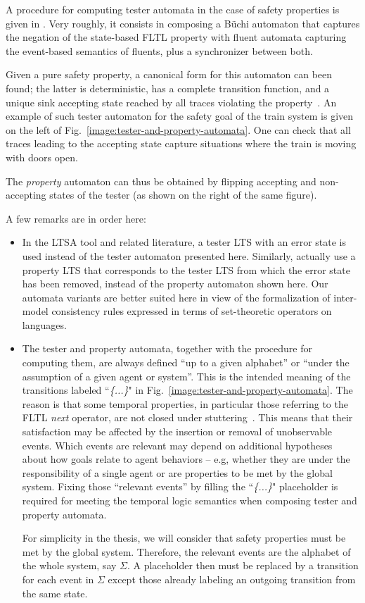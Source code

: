 A procedure for computing tester automata in the case of safety properties is given in \cite{Giannakopoulou:2003}. Very roughly, it consists in composing a B\"uchi automaton that captures the negation of the state-based FLTL property with fluent automata capturing the event-based semantics of fluents, plus a synchronizer between both. 

Given a pure safety property, a canonical form for this automaton can been found; the latter is deterministic, has a complete transition function, and a unique sink accepting state reached by all traces violating the property~\cite{Giannakopoulou:2003}. An example of such tester automaton for the safety goal of the train system is given on the left of Fig.~\ref{image:tester-and-property-automata}. One can check that all traces leading to the accepting state capture situations where the train is moving with doors open. 

The \emph{property} automaton can thus be obtained by flipping accepting and non-accepting states of the tester (as shown on the right of the same figure). 

A few remarks are in order here:
\begin{itemize}
\item In the LTSA tool \cite{Magee:1999} and related literature, a tester LTS with an error state is used instead of the tester automaton presented here. Similarly, \cite{Letier:2005, Letier:2008} actually use a property LTS that corresponds to the tester LTS from which the error state has been removed, instead of the property automaton shown here. Our automata variants are better suited here in view of the formalization of inter-model consistency rules expressed in terms of set-theoretic operators on languages. 

\item The tester and property automata, together with the procedure for computing them, are always defined ``up to a given alphabet'' or ``under the assumption of a given agent or system''. This is the intended meaning of the transitions labeled ``\emph{\{...\}}" in Fig.~\ref{image:tester-and-property-automata}. The reason is that some temporal properties, in particular those referring to the FLTL \emph{next} operator, are not closed under stuttering~\cite{Lamport:1994}. This means that their satisfaction may be affected by the insertion or removal of unobservable events. Which events are relevant may depend on additional hypotheses about how goals relate to agent behaviors -- e.g, whether they are under the responsibility of a single agent or are properties to be met by the global system. Fixing those ``relevant events'' by filling the ``\emph{\{...\}}" placeholder is required for meeting the temporal logic semantics when composing tester and property automata. 

For simplicity in the thesis, we will consider that safety properties must be met by the global system. Therefore, the relevant events are the alphabet of the whole system, say $\Sigma$. A placeholder then must be replaced by a transition for each event in $\Sigma$ except those already labeling an outgoing transition from the same state.
\end{itemize}
